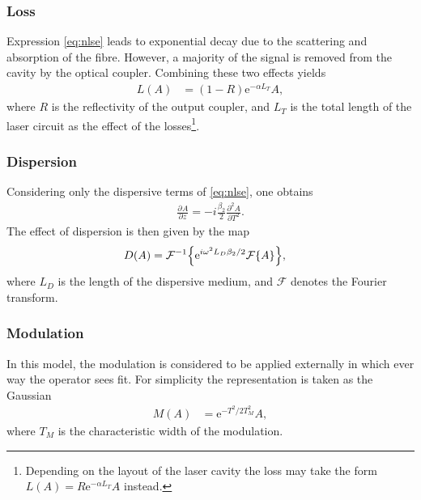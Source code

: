 \documentclass[10pt,twocolumn,a4paper]{article}
\let\originalleft\left
\let\originalright\right
\renewcommand{\left}{\mathopen{}\mathclose\bgroup\originalleft}
\renewcommand{\right}{\aftergroup\egroup\originalright}
\newcommand{\pdiff}[3][]{\frac{\partial^{#1}#2}{\partial{#3}^{#1}}}
\newcommand{\FT}[1]{\mathcal{F}\left\{ #1 \right\}}
\newcommand{\FTi}[1]{\mathcal{F}^{-1}\left\{ #1 \right\}}
\begin{document}
\subsubsection{Loss}
Expression \eqref{eq:nlse} leads to exponential decay due to the scattering and absorption of the fibre. However, a majority of the signal is removed from the cavity by the optical coupler. Combining these two effects yields
\begin{align}
L(A) &= (1 - R) \textrm{e}^{- \alpha L_T}A,
\end{align}
where $R$ is the reflectivity of the output coupler, and $L_T$ is the total length of the laser circuit as the effect of the losses\footnote{Depending on the layout of the laser cavity the loss may take the form $L(A) = R \textrm{e}^{- \alpha L_T}A$ instead.}.

\subsubsection{Dispersion}
Considering only the dispersive terms of \eqref{eq:nlse}, one obtains
\begin{align}
\label{eq:dispde}
	\pdiff{A}{z} = -i \frac{\beta_2}{2} \pdiff[2]{A}{T}.
\end{align}
The effect of dispersion is then given by the map
\begin{align}
D(A) &= \FTi{\textrm{e}^{i \omega^2 L_D\beta_2/2} \FT{A}},
\end{align}
where $L_D$ is the length of the dispersive medium, and $\mathcal{F}$ denotes the Fourier transform.

\subsubsection{Modulation}
In this model, the modulation is considered to be applied externally in which ever way the operator sees fit. For simplicity the representation is taken as the Gaussian
\begin{align}
M(A) &= \textrm{e}^{-T^2 / 2 T_M^2} A,
\end{align}
where $T_M$ is the characteristic width of the modulation.
\end{document}
